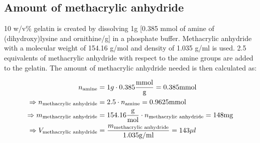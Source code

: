 \subsection{Amount of methacrylic anhydride}

10 w/v\% gelatin is created by dissolving 1g [0.385 mmol of amine of (dihydroxy)lysine and ornithine/g] in a phosphate buffer. Methacrylic anhydride with a molecular weight of 154.16 g/mol and density of 1.035 g/ml is used. 2.5 equivalents of methacrylic anhydride with respect to the amine groups are added to the gelatin. The amount of methacrylic anhydride needed is then calculated as:

\begin{align}
    n_{\text{amine}} & = 1g\cdot 0.385\frac{\unit{mmol}}{\g} = 0.385 \unit{mmol}\\
    \Rightarrow n_{\text{methacrylic anhydride}} &= 2.5\cdot n_{\text{amine}} = 0.9625 \unit{mmol} \\
    \Rightarrow m_{\text{methacrylic anhydride}} &= 154.16 \frac{\g}{\unit{mol}} \cdot n_{\text{methacrylic anhydride}} = 148 \unit{mg}\\
    \Rightarrow V_{\text{methacrylic anhydride}} &= \frac{m_{\text{methacrylic anhydride}}}{1.035 \g/\ml} = 143\mu l
\end{align}
